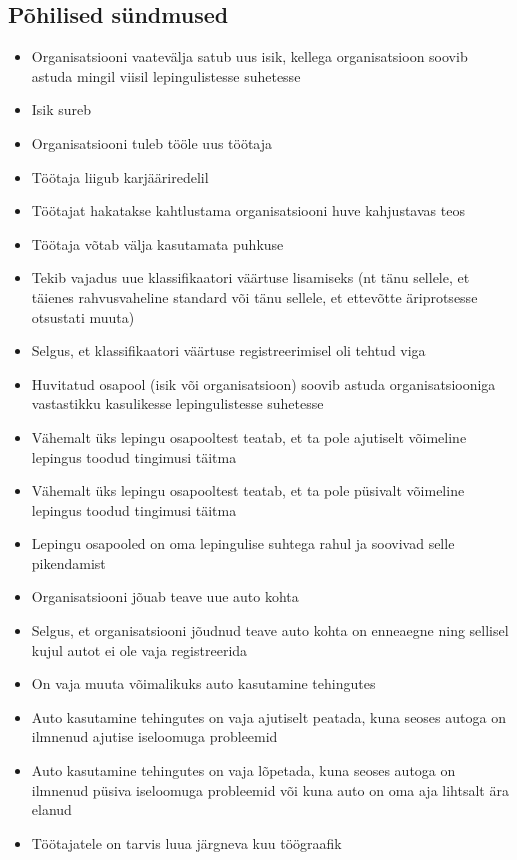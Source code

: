 \documentclass{report}
\begin{document}
 \subsection{Põhilised sündmused}
 \begin{itemize}
 	\item Organisatsiooni vaatevälja satub uus isik, kellega organisatsioon soovib  astuda mingil viisil lepingulistesse suhetesse
 	\item Isik sureb
 	\item Organisatsiooni tuleb tööle uus töötaja
 	\item Töötaja liigub karjääriredelil
 	\item Töötajat hakatakse kahtlustama organisatsiooni huve kahjustavas teos
 	\item Töötaja võtab välja kasutamata puhkuse
 	\item Tekib vajadus uue klassifikaatori väärtuse lisamiseks (nt tänu sellele, et täienes rahvusvaheline standard või tänu sellele, et ettevõtte äriprotsesse otsustati muuta)
 	\item Selgus, et klassifikaatori väärtuse registreerimisel oli tehtud viga
 	\item Huvitatud osapool (isik või organisatsioon) soovib astuda organisatsiooniga vastastikku kasulikesse lepingulistesse suhetesse
 	\item Vähemalt üks lepingu osapooltest teatab, et ta pole ajutiselt võimeline lepingus toodud tingimusi täitma
 	\item Vähemalt üks lepingu osapooltest teatab, et ta pole püsivalt võimeline lepingus toodud tingimusi täitma
 	\item Lepingu osapooled on oma lepingulise suhtega rahul ja soovivad selle pikendamist
 	\item Organisatsiooni jõuab teave uue auto kohta
 	\item Selgus, et organisatsiooni jõudnud teave auto kohta on enneaegne ning sellisel kujul autot ei ole vaja registreerida
 	\item On vaja muuta võimalikuks auto kasutamine tehingutes
 	\item Auto kasutamine tehingutes on vaja ajutiselt peatada, kuna seoses autoga on ilmnenud ajutise iseloomuga probleemid
 	\item Auto kasutamine tehingutes on vaja lõpetada, kuna seoses autoga on ilmnenud püsiva iseloomuga probleemid või kuna auto on oma aja lihtsalt ära elanud
 	\item Töötajatele on tarvis luua järgneva kuu töögraafik

\end{itemize}
\end{document}
